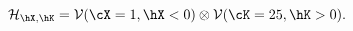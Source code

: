 \begin{equation}
%
{\cal H}_{\hX,\hK} = 
{\cal V}(\cX=1, \hX<0) \otimes {\cal V}(\cK=25, \hK>0).
\label{eq:hilbert2}
%
\end{equation}

